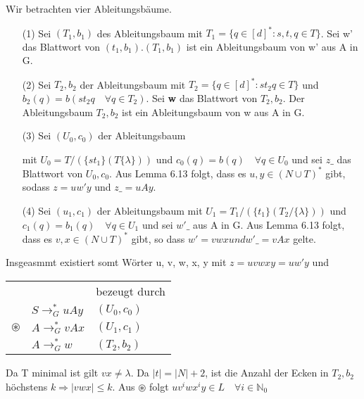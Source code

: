     Wir betrachten vier Ableitungsbäume.
    \begin{itemize}
        \item [(1)] Sei \((T_1, b_1)\) des Ableitungsbaum mit \(T_1 = \{q \in [d]^*:s,t,q \in T\}\). Sei w' das Blattwort von \((t_1, b_1)\).\((T_1, b_1)\) ist ein Ableitungsbaum von w' aus A in G.
        \item [(2)] Sei \(T_2, b_2\) der Ableitungsbaum mit \(T_2 = \{q \in [d]^* : st_2q\in T\}\) und \(b_2(q) = b(st_2q \quad \forall q\in T_2)\). Sei \textbf{w} das Blattwort von \(T_2, b_2\). Der Ableitungsbaum \(T_2, b_2\) ist ein Ableitungsbaum von w aus A in G.
        \item [(3)] Sei \((U_0, c_0)\) der Ableitungsbaum 
        
        mit \(U_0 = T/ ( \{st_1\} (T\{ \lambda
        \}))\) und \(c_0(q) = b(q) \quad \forall q \in U_0\) und sei \(z\_\) das Blattwort von \(U_0, c_0\). Aus Lemma 6.13 folgt, dass es \(u, y \in (N \cup T)^*\) gibt, sodass \(z = uw'y\) und \(z\_ = uAy\).
        \item[(4)] Sei \((u_1, c_1)\) der Ableitungsbaum mit \(U_1 = T_1/ (\{t_1\}(T_2/\{\lambda\}))\) und \(c_1(q) = b_1(q) \quad \forall q \in U_1\) und sei \(w'\_\) aus A in G. Aus Lemma 6.13 folgt, dass es \(v,x \in (N\cup T)^*\) gibt, so dass \(w' = vwx und w'\_ = vAx\) gelte.
    \end{itemize}
    Insgeasmmt existiert somt Wörter u, v, w, x, y mit \(z = uvwxy = uw'y\) und 
    \begin{center}
        \begin{tabular}{lll}
            & & bezeugt durch \\
            & \(S \to_G^* uAy\) & \((U_0, c_0)\) \\
            \(\circledast\) & \(A \to_G^* vAx\) & \((U_1, c_1)\) \\
            & \(A \to_G^* w\) & \((T_2, b_2)\) \\
       \end{tabular}       
    \end{center}
    Da T minimal ist gilt \(vx \not = \lambda\). Da \(|t| = |N| + 2\), ist die Anzahl der Ecken in \(T_2, b_2\) höchstens \(k \Rightarrow |vwx| \leq k\). Aus \(\circledast\) folgt \(uv^iwx^iy \in L \quad \forall i \in \mathbb{N}_0\)

